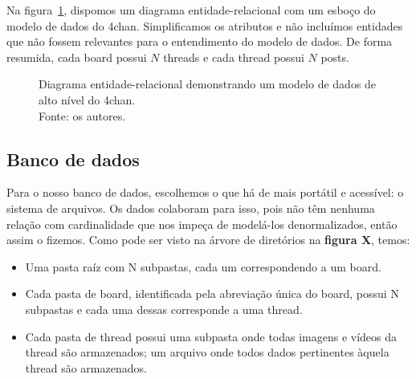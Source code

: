 Na figura~\ref{fig:er-4chan}, dispomos um diagrama entidade-relacional com um esboço do modelo de dados do 4chan.
Simplificamos os atributos e não incluímos entidades que não fossem relevantes para o entendimento do modelo de dados.
De forma resumida, cada board possui $N$ threads e cada thread possui $N$ posts.

\begin{figure}
    \centering
    \caption{
        Diagrama entidade-relacional demonstrando um modelo de dados de alto nível do 4chan.\\
        Fonte: os autores.
    }
    \label{fig:er-4chan}
\end{figure}

\subsection{Banco de dados}

Para o nosso banco de dados, escolhemos o que há de mais portátil e acessível: o sistema de arquivos.
Os dados colaboram para isso, pois não têm nenhuma relação com cardinalidade que nos impeça de modelá-los denormalizados, então assim o fizemos. Como pode ser visto na árvore de diretórios na \textbf{figura X}, temos:

\begin{itemize}
    \item Uma pasta raíz com N subpastas, cada um correspondendo a um board.
    \item Cada pasta de board, identificada pela abreviação única do board, possui N subpastas e cada uma dessas corresponde a uma thread.
    \item Cada pasta de thread possui 
        \subitem uma subpasta  onde todas imagens e vídeos da thread são armazenados;
        \subitem um arquivo  onde todos dados pertinentes àquela thread são armazenados.
\end{itemize}

